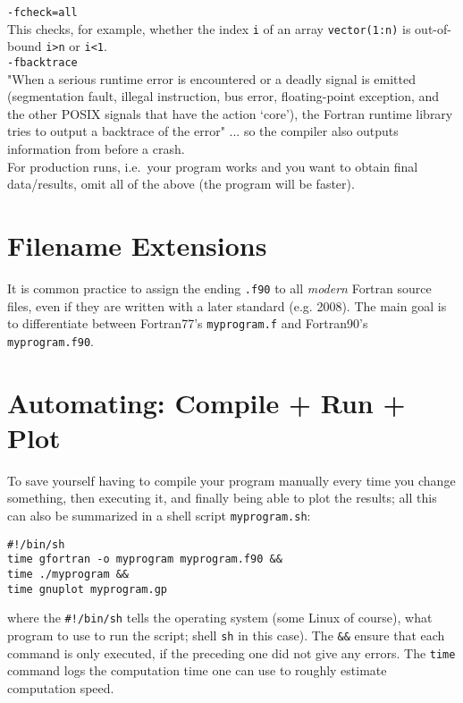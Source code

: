 \documentclass{article}
\begin{document}
\verb|-fcheck=all|\\
This checks, for example, whether the index \verb|i| of an array \verb|vector(1:n)| is out-of-bound \verb|i>n| or \verb|i<1|.\\

\verb|-fbacktrace|\\
"When a serious runtime error is encountered or a deadly signal is emitted (segmentation fault, illegal instruction, bus error, floating-point exception, and the other POSIX signals that have the action ‘core’), the Fortran runtime library tries to output a backtrace of the error" ... so the compiler also outputs information from before a crash.\\

For production runs, i.e.\ your program works and you want to obtain final data/results, omit all of the above
(the program will be faster).


\section{Filename Extensions}

It is common practice to assign the ending \verb|.f90| to all \emph{modern} Fortran source files, even if they are written with a later standard (e.g. 2008). The main goal is to differentiate between Fortran77's \verb|myprogram.f| and Fortran90's \verb|myprogram.f90|.

\section{Automating: Compile + Run + Plot}

To save yourself having to compile your program manually every time you change something, then executing it, and finally being able to plot the results; all this can also be summarized in a shell script \verb|myprogram.sh|:

\begin{verbatim}
#!/bin/sh
time gfortran -o myprogram myprogram.f90 &&
time ./myprogram &&
time gnuplot myprogram.gp
\end{verbatim}

where the \verb|#!/bin/sh| tells the operating system (some Linux of course), what program to use to run the script; shell \verb|sh| in this case). The \verb|&&| ensure that each command is only executed,
if the preceding one did not give any errors. The \verb|time| command logs the computation time one can use to roughly estimate computation speed.
\end{document}
